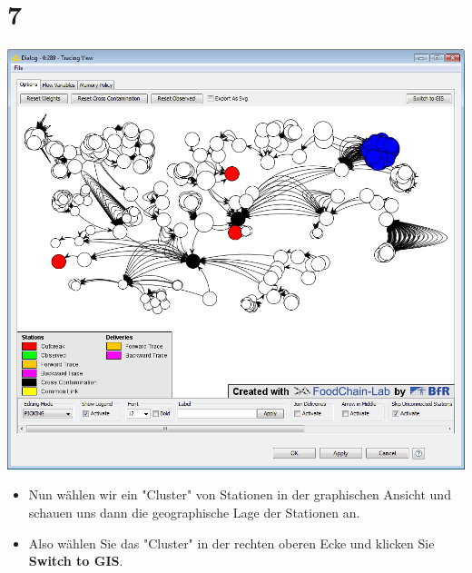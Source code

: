 \documentclass{beamer}
\begin{document}
\section{7}
\begin{frame}
	\begin{center}
  		\includegraphics[height=0.6\textheight]{7.png}
	\end{center}
	\begin{itemize}
		\item Nun wählen wir ein "Cluster" von Stationen in der graphischen Ansicht und schauen uns dann die geographische Lage der Stationen an.
		\item Also wählen Sie das "Cluster" in der rechten oberen Ecke und klicken Sie \textbf{Switch to GIS}.
	\end{itemize}
\end{frame}
\end{document}
